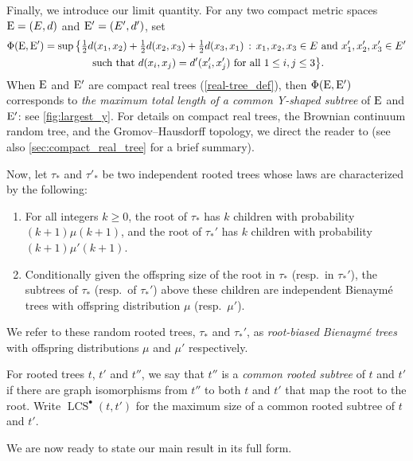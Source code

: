 \documentclass[11pt,reqno]{amsart}
\newcommand{\LCS}{\operatorname{LCS}}
\begin{document}
Finally, we introduce our limit quantity. For any two compact metric spaces $\mathrm{E}=(E,d)$ and $\mathrm{E}'=(E',d')$, set
\begin{multline}
\label{Phi}
\Phi(\mathrm{E},\mathrm{E}')=\sup\big\{\tfrac{1}{2}d(x_1,x_2)+\tfrac{1}{2}d(x_2,x_3)+\tfrac{1}{2}d(x_3,x_1) \, :\, x_1,x_2,x_3\in E\text{ and }x_1',x_2',x_3'\in E'\\
\text{ such that }d(x_i,x_j)=d'(x_i',x_j')\text{ for all }1\leq i,j\leq 3\big\}.
\end{multline}
When $\mathrm{E}$ and $\mathrm{E}'$ are compact real trees (\cref{real-tree_def}), then $\Phi(\mathrm{E},\mathrm{E}')$ corresponds to \emph{the maximum total length of a common Y-shaped subtree} of $\mathrm{E}$ and $\mathrm{E}'$: see \cref{fig:largest_y}. For details on compact real trees, the Brownian continuum random tree, and the Gromov--Hausdorff topology, we direct the reader to \cite{legall2005random} (see also \cref{sec:compact_real_tree} for a brief summary).

Now, let $\tau_*$ and $\tau'_*$ be two independent rooted trees whose laws are characterized by the following:
\begin{enumerate}
    \item[(a)] For all integers $k\geq 0$, the root of $\tau_*$ has $k$ children with probability $(k+1)\mu(k+1)$, and the root of $\tau_*'$ has $k$ children with probability $(k+1)\mu'(k+1)$.
    \item[(b)] Conditionally given the offspring size of the root in $\tau_*$ (resp.~in $\tau_*'$), the subtrees of $\tau_*$ (resp.~of $\tau_*'$) above these children are independent Bienaymé trees with offspring distribution $\mu$ (resp.~$\mu'$).
\end{enumerate}
We refer to these random rooted trees, $\tau_*$ and $\tau_*'$, as \emph{root-biased Bienaym\'{e} trees} with offspring distributions $\mu$ and $\mu'$ respectively. 

For rooted trees $t$, $t'$ and $t''$, we say that $t''$ is a \emph{common rooted subtree} of $t$ and $t'$ if there are graph isomorphisms from $t''$ to both $t$ and $t'$ that map the root to the root. Write $\LCS^\bullet(t,t')$ for the maximum size of a common rooted subtree of $t$ and $t'$.
\smallskip

We are now ready to state our main result in its full form.
\end{document}
